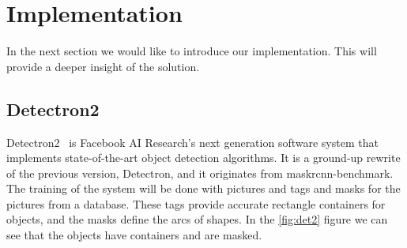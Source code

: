 
\chapter{Implementation}

In the next section we would like to introduce our implementation. This will provide a deeper insight of the solution.

\section{Detectron2}
Detectron2~\cite{detectron2} is Facebook AI Research's next generation software system that implements state-of-the-art object detection algorithms. It is a ground-up rewrite of the previous version, Detectron, and it originates from maskrcnn-benchmark. The training of the system will be done with pictures and tags and masks for the pictures from a database. These tags provide accurate rectangle containers for objects, and the masks define the arcs of shapes. In the \ref{fig:det2} figure we can see that the objects have containers and are masked.



